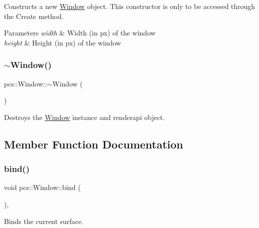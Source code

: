 Constructs a new \hyperlink{classpcs_1_1Window}{Window} object. This constructor is only to be accessed through the Create method. 


\begin{DoxyParams}{Parameters}
{\em width} & Width (in px) of the window \\
\hline
{\em height} & Height (in px) of the window \\
\hline
\end{DoxyParams}
\mbox{\label{classpcs_1_1Window_a579734a5cb40ca904947eed2f5a853bf}} 
\subsubsection{\texorpdfstring{$\sim$\+Window()}{~Window()}}
{\footnotesize\ttfamily pcs\+::\+Window\+::$\sim$\+Window (\begin{DoxyParamCaption}{ }\end{DoxyParamCaption})\hspace{0.3cm}{\ttfamily [virtual]}}



Destroys the \hyperlink{classpcs_1_1Window}{Window} instance and renderapi object. 



\subsection{Member Function Documentation}
\mbox{\label{classpcs_1_1Window_aa6e00bee6910b3146481dee7aab69cfb}} 
\subsubsection{\texorpdfstring{bind()}{bind()}}
{\footnotesize\ttfamily void pcs\+::\+Window\+::bind (\begin{DoxyParamCaption}{ }\end{DoxyParamCaption})\hspace{0.3cm}{\ttfamily [override]}, {\ttfamily [virtual]}}



Binds the current surface. 



